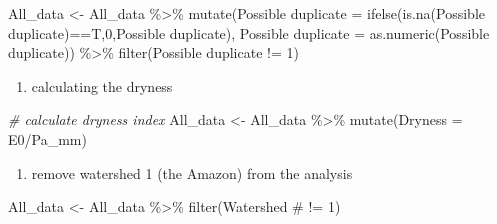 \documentclass[]{elsarticle} %
\newenvironment{Shaded}{\begin{snugshade}}{\end{snugshade}}
\newcommand{\AttributeTok}[1]{\textcolor[rgb]{0.77,0.63,0.00}{#1}}
\newcommand{\CommentTok}[1]{\textcolor[rgb]{0.56,0.35,0.01}{\textit{#1}}}
\newcommand{\DecValTok}[1]{\textcolor[rgb]{0.00,0.00,0.81}{#1}}
\newcommand{\FunctionTok}[1]{\textcolor[rgb]{0.00,0.00,0.00}{#1}}
\newcommand{\NormalTok}[1]{#1}
\newcommand{\OtherTok}[1]{\textcolor[rgb]{0.56,0.35,0.01}{#1}}
\newcommand{\SpecialCharTok}[1]{\textcolor[rgb]{0.00,0.00,0.00}{#1}}
\newcommand{\StringTok}[1]{\textcolor[rgb]{0.31,0.60,0.02}{#1}}
\providecommand{\tightlist}{%
  \setlength{\itemsep}{0pt}\setlength{\parskip}{0pt}}
\begin{document}
\begin{Shaded}
\begin{Highlighting}[]
\NormalTok{All\_data }\OtherTok{\textless{}{-}}\NormalTok{ All\_data }\SpecialCharTok{\%\textgreater{}\%}
  \FunctionTok{mutate}\NormalTok{(}\StringTok{\textasciigrave{}}\AttributeTok{Possible duplicate}\StringTok{\textasciigrave{}} \OtherTok{=} 
           \FunctionTok{ifelse}\NormalTok{(}\FunctionTok{is.na}\NormalTok{(}\StringTok{\textasciigrave{}}\AttributeTok{Possible duplicate}\StringTok{\textasciigrave{}}\NormalTok{)}\SpecialCharTok{==}\NormalTok{T,}\DecValTok{0}\NormalTok{,}\StringTok{\textasciigrave{}}\AttributeTok{Possible duplicate}\StringTok{\textasciigrave{}}\NormalTok{),}
         \StringTok{\textasciigrave{}}\AttributeTok{Possible duplicate}\StringTok{\textasciigrave{}} \OtherTok{=} \FunctionTok{as.numeric}\NormalTok{(}\StringTok{\textasciigrave{}}\AttributeTok{Possible duplicate}\StringTok{\textasciigrave{}}\NormalTok{)) }\SpecialCharTok{\%\textgreater{}\%}
  \FunctionTok{filter}\NormalTok{(}\StringTok{\textasciigrave{}}\AttributeTok{Possible duplicate}\StringTok{\textasciigrave{}} \SpecialCharTok{!=} \DecValTok{1}\NormalTok{)}
\end{Highlighting}
\end{Shaded}

\begin{enumerate}
\def\labelenumi{\arabic{enumi}.}
\setcounter{enumi}{1}
\tightlist
\item
  calculating the dryness
\end{enumerate}

\begin{Shaded}
\begin{Highlighting}[]
\CommentTok{\# calculate dryness index}
\NormalTok{All\_data }\OtherTok{\textless{}{-}}\NormalTok{ All\_data }\SpecialCharTok{\%\textgreater{}\%}
  \FunctionTok{mutate}\NormalTok{(}\AttributeTok{Dryness =}\NormalTok{ E0}\SpecialCharTok{/}\NormalTok{Pa\_mm)}
\end{Highlighting}
\end{Shaded}

\begin{enumerate}
\def\labelenumi{\arabic{enumi}.}
\setcounter{enumi}{2}
\tightlist
\item
  remove watershed 1 (the Amazon) from the analysis
\end{enumerate}

\begin{Shaded}
\begin{Highlighting}[]
\NormalTok{All\_data }\OtherTok{\textless{}{-}}\NormalTok{ All\_data }\SpecialCharTok{\%\textgreater{}\%}
  \FunctionTok{filter}\NormalTok{(}\StringTok{\textasciigrave{}}\AttributeTok{Watershed \#}\StringTok{\textasciigrave{}} \SpecialCharTok{!=} \DecValTok{1}\NormalTok{)}
\end{Highlighting}
\end{Shaded}
\end{document}
